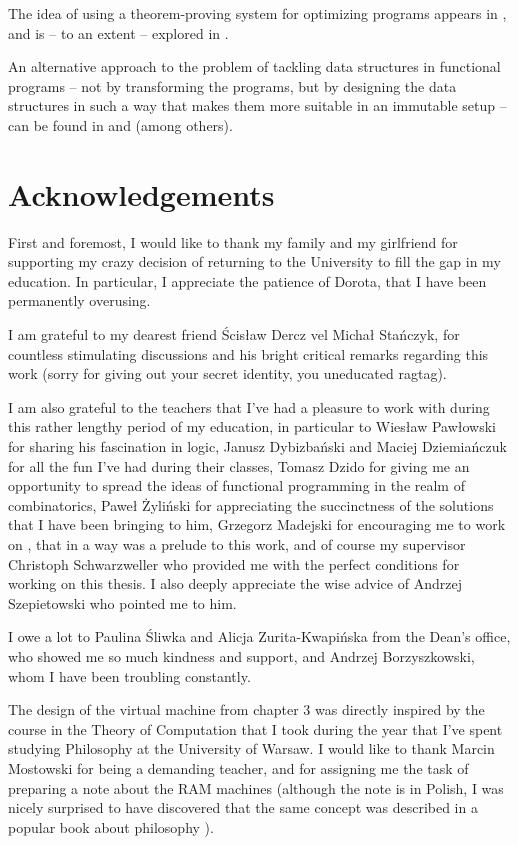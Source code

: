 The idea of using a theorem-proving system for optimizing programs
appears in \cite{FutamuraKonishiGluck2001}, and is -- to an extent
-- explored in \cite{BurstallDarlington1977}.

An alternative approach to the problem of tackling data structures
in functional programs -- not by transforming the programs, but
by designing the data structures in such a way that makes them
more suitable in an immutable setup -- can be found in \cite{Okasaki1996}
and \cite{Bagwell2002} (among others).

\section{Acknowledgements}

First and foremost, I would like to thank my family and my girlfriend
for supporting my crazy decision of returning to the University to
fill the gap in my education. In particular, I appreciate the patience
of Dorota, that I have been permanently overusing.

I am grateful to my dearest friend Ścisław Dercz vel Michał Stańczyk,
for countless stimulating discussions and his bright critical remarks
regarding this work (sorry for giving out your secret identity, you
uneducated ragtag). 

I am also grateful to the teachers that I've had a pleasure to work
with during this rather lengthy period of my education, in particular
to Wiesław Pawłowski for sharing his fascination in logic, Janusz
Dybizbański and Maciej Dziemiańczuk for all the fun I've had during
their classes, Tomasz Dzido for giving me an opportunity to spread
the ideas of functional programming in the realm of combinatorics,
Paweł Żyliński for appreciating the succinctness of the solutions
that I have been bringing to him, Grzegorz Madejski for encouraging
me to work on \cite{Godek2016}, that in a way was a prelude to this
work, and of course my supervisor Christoph Schwarzweller who provided
me with the perfect conditions for working on this thesis. I also
deeply appreciate the wise advice of Andrzej Szepietowski who
pointed me to him.

I owe a lot to Paulina Śliwka and Alicja Zurita-Kwapińska from
the Dean's office, who showed me so much kindness and support, and
Andrzej Borzyszkowski, whom I have been troubling constantly.

The design of the virtual machine from chapter 3 was directly
inspired by the course in the Theory of Computation that I took
during the year that I've spent studying Philosophy at the University
of Warsaw. I would like to thank Marcin Mostowski for being a demanding
teacher, and for assigning me the task of preparing a note about the
RAM machines \cite{Godek2012} (although the note is in Polish,
I was nicely surprised to have discovered that the same concept
was described in a popular book about philosophy \cite{Dennett2013}).

